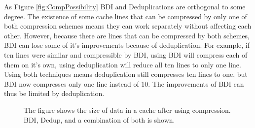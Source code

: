 As Figure \ref{fig:CompPossibility} BDI and Deduplications are orthogonal to some degree. The existence of some cache lines that can be compressed by only one of both compression schemes means they can work separately without affecting each other. However, because there are lines that can be compressed by both schemes, BDI can lose some of it's improvements because of deduplication. For example, if ten lines were similar and compressible by BDI, using BDI will compress each of them on it's own, using deduplication will reduce all ten lines to only one line. Using both techniques means deduplication still compresses ten lines to one, but BDI now compresses only one line instead of 10. The improvements of BDI can thus be limited by deduplication.\par
\begin{figure}
    \begin{subfigure}[t]{\textwidth}
    \end{subfigure}
    \begin{subfigure}[b]{\textwidth}
    \end{subfigure}
    \caption[Size after compression]{The figure shows the size of data in a cache after using compression. BDI, Dedup, and a combination of both is shown.}
    \label{fig:CompSize}
\end{figure}
